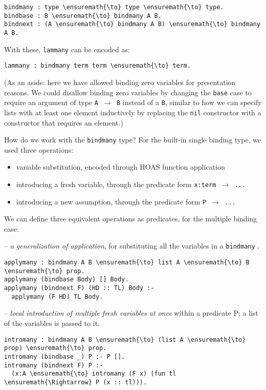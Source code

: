 \begin{verbatim}
bindmany : type \ensuremath{\to} type \ensuremath{\to} type.
bindbase : B \ensuremath{\to} bindmany A B.
bindnext : (A \ensuremath{\to} bindmany A B) \ensuremath{\to} bindmany A B.
\end{verbatim}

With these, \texttt{lammany} can be encoded as:

\begin{verbatim}
lammany : bindmany term term \ensuremath{\to} term.
\end{verbatim}

(As an aside: here we have allowed binding zero variables for
presentation reasons. We could disallow binding zero variables by
changing the \texttt{base} case to require an argument of type
\texttt{A\ \ensuremath{\to}\ B} instead of a \texttt{B}, similar to how
we can specify lists with at least one element inductively by replacing
the \texttt{nil} constructor with a constructor that requires an
element.)

How do we work with the \texttt{bindmany} type? For the built-in single
binding type, we used three operations:

\begin{itemize}
\tightlist
\item
  variable substitution, encoded through HOAS function application
\item
  introducing a fresh variable, through the predicate form
  \texttt{x:term\ \ensuremath{\to}\ ...}
\item
  introducing a new assumption, through the predicate form
  \texttt{P\ \ensuremath{\to}\ ...}
\end{itemize}

We can define three equivalent operations as predicates, for the
multiple binding case:

-- \emph{a generalization of application}, for substituting all the
variables in a \texttt{bindmany} .

\begin{verbatim}
applymany : bindmany A B \ensuremath{\to} list A \ensuremath{\to} B \ensuremath{\to} prop.
applymany (bindbase Body) [] Body.
applymany (bindnext F) (HD :: TL) Body :-
  applymany (F HD) TL Body.
\end{verbatim}

-- \emph{local introduction of multiple fresh variables at once} within
a predicate P; a list of the variables is passed to it.

\begin{verbatim}
intromany : bindmany A B \ensuremath{\to} (list A \ensuremath{\to} prop) \ensuremath{\to} prop.
intromany (bindbase _) P :- P [].
intromany (bindnext F) P :-
  (x:A \ensuremath{\to} intromany (F x) (fun tl \ensuremath{\Rightarrow} P (x :: tl))).
\end{verbatim}

